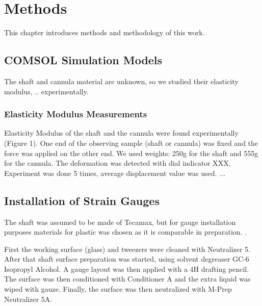 %
%
%



\chapter{Methods}
\label{methods} %

This chapter introduces methods and methodology of this work.

\section{COMSOL Simulation Models}
\label{sec:SimMod}

The shaft and cannula material are unknown, so we studied their elasticity modulus, .. experimentally.

\subsection{Elasticity Modulus Measurements}
\label{sec:ElasMod}
Elasticity Modulus of the shaft and the cannula were found experimentally (Figure 1). One end of the observing sample (shaft or cannula) was fixed and the force was applied on the other end. We used weights: 250g for the shaft and 555g for the cannula. The deformation was detected with dial indicator XXX. Experiment was done 5 times, average displacement value was used.
...

\section{Installation of Strain Gauges}
\label{sec:instSG}

The shaft was assumed to be made of Tecamax, but for gauge installation purposes materials for plastic was chosen as it is comparable in preparation. \cite{StrGugeInst}.

First the working surface (glass) and tweezers were cleaned with Neutralizer 5. After that shaft surface preparation was started, using solvent degreaser GC-6 Isopropyl Alcohol. A gauge layout was then applied with a 4H drafting pencil. The surface was then conditioned with Conditioner A and the extra liquid was wiped with gauze. Finally, the surface was then neutralized with M-Prep Neutralizer 5A. \cite{StrGugeInst}

